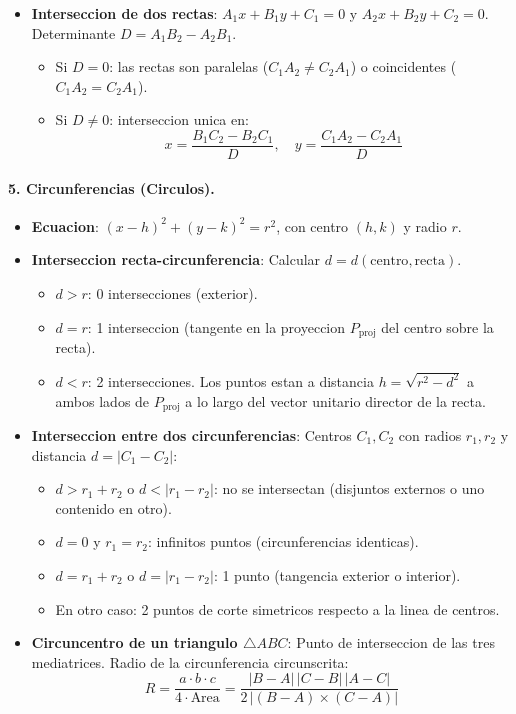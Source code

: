 \begin{itemize}\setlength\itemsep{0pt}
	\item \textbf{Interseccion de dos rectas}:
	$A_1 x + B_1 y + C_1 = 0$ y $A_2 x + B_2 y + C_2 = 0$.
	Determinante $D = A_1 B_2 - A_2 B_1$.
	\begin{itemize}\setlength\itemsep{0pt}
		\item Si $D = 0$: las rectas son paralelas ($C_1 A_2 \ne C_2 A_1$) o coincidentes ($C_1 A_2 = C_2 A_1$).
		\item Si $D \ne 0$: interseccion unica en:
		\[
			x = \frac{B_1 C_2 - B_2 C_1}{D}, \quad y = \frac{C_1 A_2 - C_2 A_1}{D}
		\]
	\end{itemize}
\end{itemize}

\paragraph{5. Circunferencias (Circulos).}
\begin{itemize}\setlength\itemsep{0pt}
	\item \textbf{Ecuacion}: $(x - h)^2 + (y - k)^2 = r^2$, con centro $(h, k)$ y radio $r$.
	\item \textbf{Interseccion recta-circunferencia}:
	Calcular $d = d(\text{centro}, \text{recta})$.
	\begin{itemize}\setlength\itemsep{0pt}
		\item $d > r$: 0 intersecciones (exterior).
		\item $d = r$: 1 interseccion (tangente en la proyeccion $P_{\text{proj}}$ del centro sobre la recta).
		\item $d < r$: 2 intersecciones. Los puntos estan a distancia $h = \sqrt{r^2 - d^2}$ a ambos lados de $P_{\text{proj}}$ a lo largo del vector unitario director de la recta.
	\end{itemize}
	\item \textbf{Interseccion entre dos circunferencias}:
	Centros $C_1, C_2$ con radios $r_1, r_2$ y distancia $d = |C_1 - C_2|$:
	\begin{itemize}\setlength\itemsep{0pt}
		\item $d > r_1 + r_2$ o $d < |r_1 - r_2|$: no se intersectan (disjuntos externos o uno contenido en otro).
		\item $d = 0$ y $r_1 = r_2$: infinitos puntos (circunferencias identicas).
		\item $d = r_1 + r_2$ o $d = |r_1 - r_2|$: 1 punto (tangencia exterior o interior).
		\item En otro caso: 2 puntos de corte simetricos respecto a la linea de centros.
	\end{itemize}
	\item \textbf{Circuncentro de un triangulo $\triangle ABC$}:
	Punto de interseccion de las tres mediatrices.
	Radio de la circunferencia circunscrita:
	\[
		R = \frac{a \cdot b \cdot c}{4 \cdot \text{Area}} = \frac{|B - A| \, |C - B| \, |A - C|}{2 \, |(B - A) \times (C - A)|}
	\]
\end{itemize}

